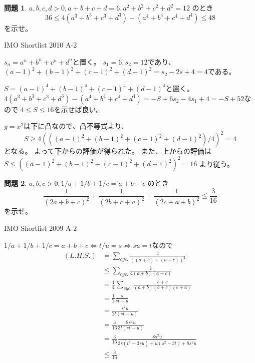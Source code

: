 \documentclass[uplatex, a5paper]{jsarticle}
\makeatletter
\theoremstyle{definition}
\newtheorem{prob}{問題}
\renewenvironment{proof}[1][\proofname]{
  \pushQED{\qed}%
  \normalfont \topsep6\p@\@plus6\p@\relax
  \trivlist
  \item[\hskip\labelsep
    #1\@addpunct{\textbf{.}}]\ignorespaces
}{%
  \popQED\endtrivlist\@endpefalse
}
\providecommand{\proofname}{証明}
\def\qed{\hfill $\Box$}
\makeatother
\begin{document}
\begin{prob}
  \(a,b,c,d>0,a+b+c+d=6,a^2+b^2+c^2+d^2=12\)
  のとき
  \[
  36\leq 4(a^3+b^3+c^3+d^3 )-(a^4+b^4+c^4+d^4) \leq 48
  \]
  を示せ。
  \begin{flushright}
    IMO Shortlist 2010 A-2
  \end{flushright}
\end{prob}


\begin{proof}
  \(s_n= a^n+b^n+c^n+d^n\)と置く。
  \(s_1=6,s_2=12\)であり、
  \((a-1)^2+(b-1)^2+(c-1)^2+(d-1)^2 = s_2 -2s +4 = 4\)である。

  \(S= (a-1)^4 + (b-1)^4 + (c-1)^4 + (d-1)^4\)と置く。
  \(4(a^3+b^3+c^3+d^3 )-(a^4+b^4+c^4+d^4)= -S + 6s_2 -4s_1 +4 = -S +52\)なので
  \(4 \leq S \leq 16\)を示せば良い。

  \(y=x^2\)は下に凸なので、凸不等式より、
  \[S \geq 4 \left( \left( (a-1)^2+(b-1)^2+(c-1)^2+(d-1)^2 \right) /4 \right) ^2 = 4\]
  となる。
  よって下からの評価が得られた。
  また、上からの評価は
  \(S \leq \left( (a-1)^2+(b-1)^2+(c-1)^2+(d-1)^2 \right) ^2 = 16\)
  より従う。
\end{proof}











\newpage

\begin{prob}
  \(a,b,c>0 , 1/a + 1/b + 1/c = a+b+c\)
  のとき
  \[
  \frac{1}{(2a+b+c)^2} +\frac{1}{(2b+c+a)^2} +\frac{1}{(2c+a+b)^2} \leq \frac{3}{16}
  \]
  を示せ。
  \begin{flushright}
    IMO Shortlist 2009 A-2
  \end{flushright}
\end{prob}


\begin{proof}
  \(1/a + 1/b + 1/c = a+b+c \Leftrightarrow t/u=s \Leftrightarrow su=t\)なので
  \begin{align*}
    ( L.H.S.) &= \sum_{cyc.} \frac{1}{\left( (a+b) + (a+c) \right)^2}  \\
    &\leq \sum_{cyc.} \frac{1}{ 4(a+b)(a+c) } \\
    &= \frac{1}{4} \sum_{cyc.} \frac{b+c}{(a+b)(b+c)(c+a)} \\
    &= \frac{1}{2} \frac{s}{st-u}  \\
    &= \frac{s^2u}{2t(st-u)}  \\
    &= \frac{3}{16} \frac{8s^2u}{3t(st-u)}  \\
    &= \frac{3}{16} \frac{8s^2u}{ 3s(t^2-3su) + u(s^2 -3t) + 8s^2u }  \\
    &\leq \frac{3}{16}
  \end{align*}
\end{proof}
\end{document}
